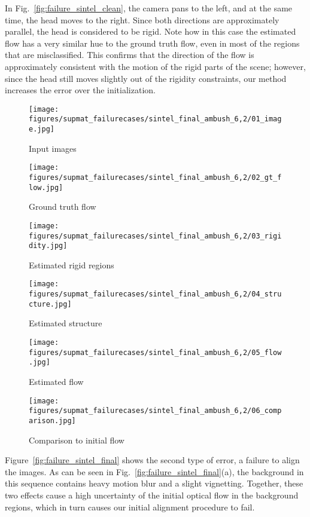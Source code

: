 \documentclass[10pt,twocolumn,letterpaper]{article}
\begin{document}
In Fig.~\ref{fig:failure_sintel_clean}, the camera pans to the left, and at the same time, the head moves to the right. Since both directions are approximately parallel, the head is considered to be rigid.
Note how in this case the estimated flow has a very similar hue to the ground truth flow, even in most of the regions that are misclassified.
This confirms that the direction of the flow is approximately consistent with the motion of the rigid parts of the scene; however, since the head still moves slightly out of the rigidity constraints, our method increases the error over the initialization.


\begin{figure*}[h!]
\captionsetup{justification=centering}
\centering
\begin{subfigure}[t]{\failurewidth}
	\texttt{[image: figures/supmat\_failurecases/sintel\_final\_ambush\_6,2/01\_image.jpg]}
	\caption{Input images}
\end{subfigure}\begin{subfigure}[t]{\failurewidth}
	\texttt{[image: figures/supmat\_failurecases/sintel\_final\_ambush\_6,2/02\_gt\_flow.jpg]}
	\caption{Ground truth flow}
\end{subfigure}\begin{subfigure}[t]{\failurewidth}
	\texttt{[image: figures/supmat\_failurecases/sintel\_final\_ambush\_6,2/03\_rigidity.jpg]}
	\caption{Estimated rigid regions}
\end{subfigure}
\begin{subfigure}[t]{\failurewidth}
	\texttt{[image: figures/supmat\_failurecases/sintel\_final\_ambush\_6,2/04\_structure.jpg]}
	\caption{Estimated structure}
\end{subfigure}\begin{subfigure}[t]{\failurewidth}
	\texttt{[image: figures/supmat\_failurecases/sintel\_final\_ambush\_6,2/05\_flow.jpg]}
	\caption{Estimated flow}
\end{subfigure}\begin{subfigure}[t]{\failurewidth}
	\texttt{[image: figures/supmat\_failurecases/sintel\_final\_ambush\_6,2/06\_comparison.jpg]}
	\caption{Comparison to initial flow}
\end{subfigure}
\caption{Failure case Sintel final: Strong motion blur destroys the alignment. \\EPE initialization: $11.17$. EPE MR-Flow: $12.21$.}
\label{fig:failure_sintel_final}
\end{figure*}

Figure~\ref{fig:failure_sintel_final} shows the second type of error, a failure to align the images.
As can be seen in Fig.~\ref{fig:failure_sintel_final}(a), the background in this sequence contains heavy motion blur and a slight vignetting.
Together, these two effects cause a high uncertainty of the initial optical flow in the background regions, which in turn causes our initial alignment procedure to fail.


 
\end{document}
